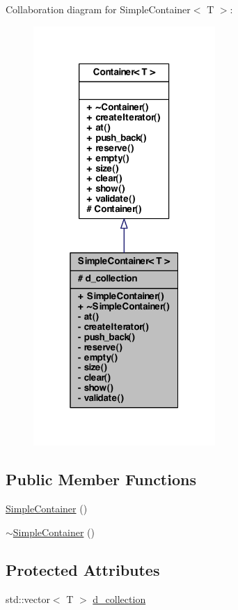 Collaboration diagram for SimpleContainer$<$ T $>$:\nopagebreak
\begin{figure}[H]
\begin{center}
\leavevmode
\includegraphics[width=196pt]{class_simple_container__coll__graph}
\end{center}
\end{figure}
\subsection*{Public Member Functions}
\begin{DoxyCompactItemize}
\item 
\hyperlink{class_simple_container_a87d087aab51b4b6aad359ad906a90e4d}{SimpleContainer} ()
\item 
\hyperlink{class_simple_container_ad0704bf9c306ab57a9c4a2b83879670c}{$\sim$SimpleContainer} ()
\end{DoxyCompactItemize}
\subsection*{Protected Attributes}
\begin{DoxyCompactItemize}
\item 
std::vector$<$ T $>$ \hyperlink{class_simple_container_a0be5592282fc09b51a344d4083a7daf9}{d\_\-collection}
\end{DoxyCompactItemize}
